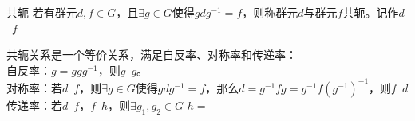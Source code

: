 
\begin{issues}
\issueDraft
\end{issues}
\begin{definition}{共轭}
若有群元$d,f\in G$，且$\exists g\in G$使得$gdg^{-1}=f$，则称群元$d$与群元$f$共轭。记作$d$~$f$
\end{definition}

共轭关系是一个等价关系，满足自反率、对称率和传递率：\\
自反率：$g=ggg^{-1}$，则$g$~$g$。 \\
对称率：若$d$~$f$，则$\exists g\in G$使得$gdg^{-1}=f$，那么$d=g^{-1}fg=
g^{-1}f(g^{-1})^{-1}$，则$f$~$d$ \\
传递率：若$d$~$f$，$f$~$h$，则$\exists g_1,g_2\in G$ $h=$

